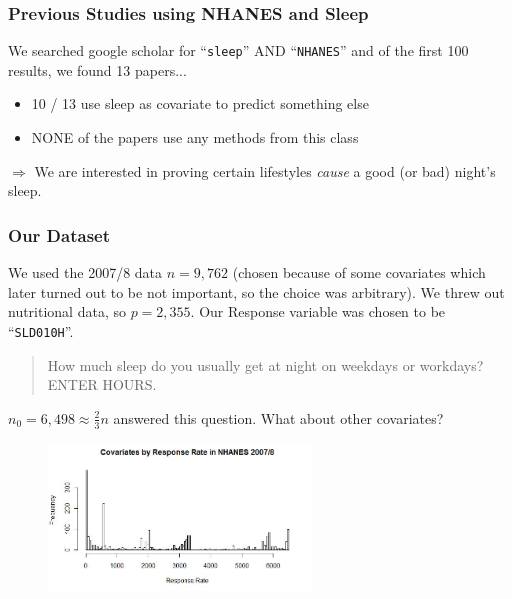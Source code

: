 \documentclass[presentation]{beamer}
\begin{document}
\begin{frame}
	\frametitle{Previous Studies using NHANES and Sleep}

We searched google scholar for ``\texttt{sleep}'' AND ``\texttt{NHANES}'' and of the first 100 results, we found 13 papers... \pause

\begin{itemize}
\item 10 / 13 use sleep as covariate to predict something else \pause
\item NONE of the papers use any methods from this class 
\end{itemize}

$\Rightarrow$ \pause We are interested in proving certain lifestyles \textit{cause} a good (or bad) night's sleep.

\end{frame}

\begin{frame}
	\frametitle{Our Dataset}

\footnotesize
We used the 2007/8 data $n = 9,762$ \pause (chosen because of some covariates which later turned out to be not important, so the choice was arbitrary).  \pause We threw out nutritional data, so $p = 2,355$.  \pause Our Response variable was chosen to be ``\texttt{SLD010H}''. 


\vspace{0.2cm}

\begin{quotation}
How much sleep do you usually get at night on weekdays or workdays? ENTER HOURS. 
\end{quotation}

$n_0 = 6,498 \approx \frac{2}{3}n$ answered this question. \pause What about other covariates?
\normalsize


\begin{figure}[htp]
\centering
\includegraphics[width=2.75in]{cov_by_response.jpg}
\end{figure}
\FloatBarrier

\pause

\end{frame}
\end{document}
